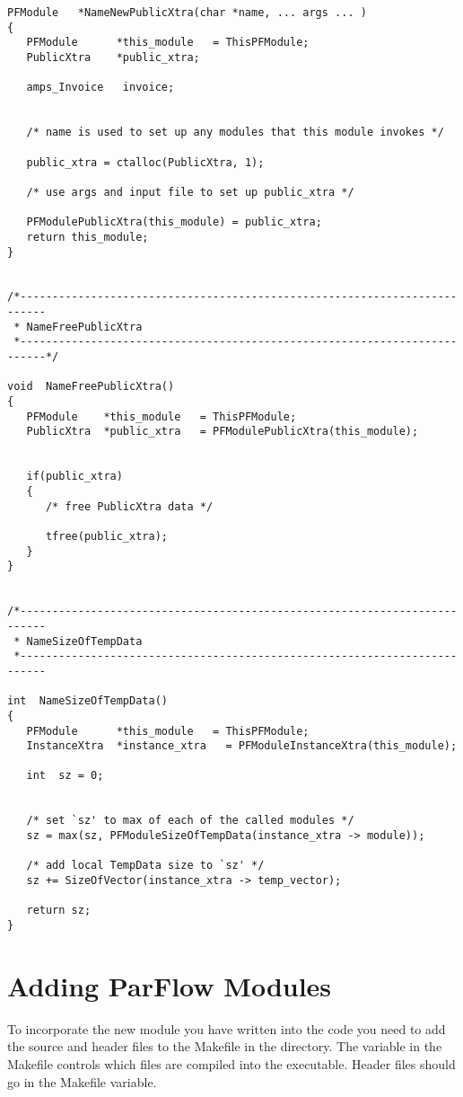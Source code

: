 \begin{verbatim}
PFModule   *NameNewPublicXtra(char *name, ... args ... )
{
   PFModule      *this_module   = ThisPFModule;
   PublicXtra    *public_xtra;

   amps_Invoice   invoice;


   /* name is used to set up any modules that this module invokes */

   public_xtra = ctalloc(PublicXtra, 1);

   /* use args and input file to set up public_xtra */

   PFModulePublicXtra(this_module) = public_xtra;
   return this_module;
}


/*--------------------------------------------------------------------------
 * NameFreePublicXtra
 *--------------------------------------------------------------------------*/

void  NameFreePublicXtra()
{
   PFModule    *this_module   = ThisPFModule;
   PublicXtra  *public_xtra   = PFModulePublicXtra(this_module);


   if(public_xtra)
   {
      /* free PublicXtra data */

      tfree(public_xtra);
   }
}


/*--------------------------------------------------------------------------
 * NameSizeOfTempData
 *--------------------------------------------------------------------------

int  NameSizeOfTempData()
{
   PFModule      *this_module   = ThisPFModule;
   InstanceXtra  *instance_xtra   = PFModuleInstanceXtra(this_module);

   int  sz = 0;


   /* set `sz' to max of each of the called modules */
   sz = max(sz, PFModuleSizeOfTempData(instance_xtra -> module));

   /* add local TempData size to `sz' */
   sz += SizeOfVector(instance_xtra -> temp_vector);

   return sz;
}

\end{verbatim}


\section{Adding ParFlow Modules}
\label{Adding ParFlow Modules}

To incorporate the new module you have written into the \parflow{} code
you need to add the source and header files to the Makefile in the
 directory. The  variable in the Makefile 
controls which files are
compiled into the executable.  Header files should go in the
 Makefile variable.
